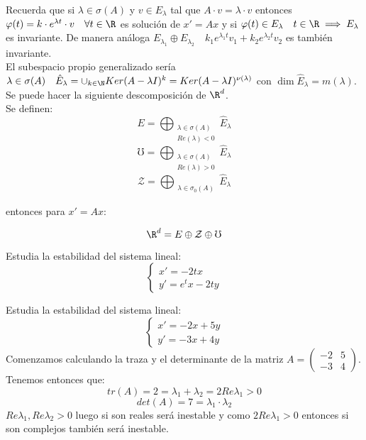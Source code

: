 \begin{nota}
Recuerda que si $\lambda \in \sigma(A)$ y $v \in E_\lambda$ tal que $A\cdot v =\lambda\cdot v$ entonces $\varphi(t)=k\cdot e^{\lambda t}\cdot v \quad \forall t \in \R$ es solución de $x'=Ax$ y si $\varphi(t)\in E_\lambda \quad t \in \R \implies E_\lambda$ es invariante. De manera análoga $E_{\lambda_1}\oplus E_{\lambda_2} \quad k_1 e^{\lambda_1 t}v_1+k_2 e^{\lambda_2 t}v_2$ es también invariante.\\
El subespacio propio generalizado sería $\lambda\in\sigma(A) \quad \hat{E}_\lambda = \cup_{k\in\N}Ker(A-\lambda I)^k=Ker(A-\lambda I)^{\nu(\lambda) }$ con $\dim \hat{E}_\lambda=m(\lambda)$.\\
Se puede hacer la siguiente descomposición de $\R^d$.\\
Se definen:
$$E=\bigoplus_{ \begin{array}{c}\lambda\in\sigma(A)\\ Re(\lambda)<0\end{array}}\hat{E}_\lambda$$
$$\mho=\bigoplus_{\begin{array}{c}\lambda\in\sigma(A) \\ Re(\lambda)>0\end{array}}\hat{E}_\lambda$$
$$\mathcal{Z}=\bigoplus_{\begin{array}{c}\lambda\in\sigma_0(A)\end{array}}\hat{E}_\lambda$$
\end{nota}


entonces para $x'=Ax$:

$$\R^d=E\oplus\mathcal{Z}\oplus\mho$$

\begin{ejer}
Estudia la estabilidad del sistema lineal:
\[
\left\{\begin{array}{ll}
x'=-2tx \\
y'=e^tx-2ty
\end{array}\right.
\]
\end{ejer}
\begin{ejer}
Estudia la estabilidad del sistema lineal:
\[
\left\{\begin{array}{ll}
x'=-2x+5y\\
y'=-3x+4y
\end{array}\right.
\]
Comenzamos calculando la traza y el determinante de la matriz $A=\begin{pmatrix}-2 & 5 \\ -3 & 4 \end{pmatrix}$. Tenemos entonces que:
$$tr(A)=2=\lambda_1+\lambda_2=2 Re \lambda_1 >0$$
$$det(A)=7=\lambda_1 \cdot \lambda_2$$
$Re\lambda_1, Re\lambda_2>0$ luego si son reales será inestable y como $2 Re \lambda_1 >0$ entonces si son complejos también será inestable.
\end{ejer}


